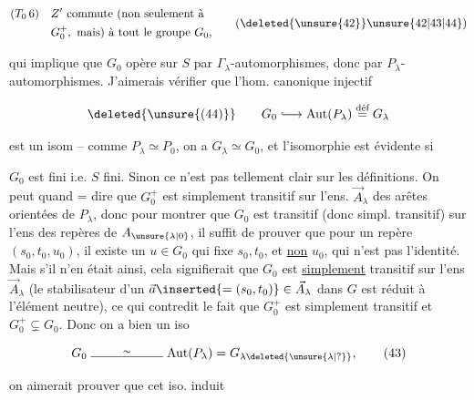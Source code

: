 \[
\begin{aligned}
(T_0\,6)\quad &Z'\text{ commute (non seulement à}\\
&G_0^+,\text{ mais) à tout le groupe }G_0,
\end{aligned}\tag*{$(\deleted{\unsure{42}}\unsure{42|43|44})$}
\]


qui implique que $G_0$ opère sur $S$ par $\Gamma_\lambda$-automorphismes, donc par $P_\lambda$-automorphismes.  J'aimerais vérifier que l'hom. canonique injectif

\[
\deleted{\unsure{(44)}}\qquad G_0\lhook\joinrel\longrightarrow\operatorname{Aut}(P_\lambda)\overset{\text{déf}}{=}G_\lambda
\]

est un isom -- comme $P_\lambda\simeq P_0$, on a $G_\lambda\simeq G_0$, et l'isomorphie est évidente si

$G_0$ est fini i.e. $S$ fini. Sinon ce n'est pas tellement clair sur les définitions. On peut quand = dire que  $G_0^+$ est simplement transitif sur l'ens. $\vec A_\lambda$ des arêtes orientées de  $P_\lambda$, donc  pour montrer que $G_0$ est transitif (donc  simpl. transitif) sur l'ens des repères de $A_{\unsure{\lambda|0}}$,   il suffit de prouver que pour  un repère $(s_0,t_0,u_0)$, il existe un $u\in G_0$  qui fixe $s_0,t_0$, et \uline{non} $u_0$,  qui n'est pas l'identité. Mais s'il n'en était ainsi, cela signifierait que $G_0$ est \uline{simplement} transitif sur l'ens $\vec A_\lambda$ (le stabilisateur d'un $\vec a\inserted{=(s_0,t_0)}\in\vec A_\lambda$ dans $G$ est réduit à l'élément neutre), ce qui contredit le fait que $G_0^+$ est simplement transitif et  $G_0^+\subsetneq G_0$. Donc on a bien un iso

\[
G_0\mathrel{\overset{\sim}{\rule{2cm}{0.4pt}}}\operatorname{Aut}(P_\lambda)=G_{\lambda\deleted{\unsure{\lambda|?}}},
\tag*{$(43)$}
\]

on aimerait prouver que cet iso. induit

